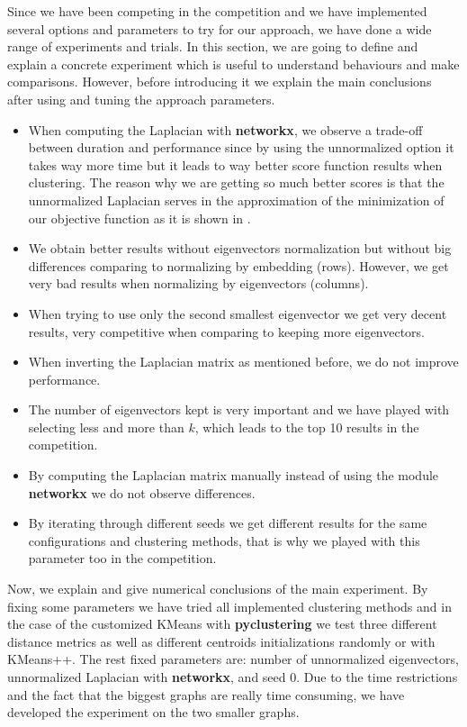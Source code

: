 \documentclass[11pt]{extarticle}
\begin{document}
\label{results}

Since we have been competing in the competition and we have implemented several options and parameters to try for our approach, we have done a wide range of experiments and trials. In this section, we are going to define and explain a concrete experiment which is useful to understand behaviours and make comparisons. However, before introducing it we explain the main conclusions after using and tuning the approach parameters.
\begin{itemize}
    \item When computing the Laplacian with \textbf{networkx}, we observe a trade-off between duration and performance since by using the unnormalized option it takes way more time but it leads to way better score function results when clustering. The reason why we are getting so much better scores is that the unnormalized Laplacian serves in the approximation of the minimization of our objective function as it is shown in \cite{buger_2015}. 
    \item We obtain better results without eigenvectors normalization but without big differences comparing to normalizing by embedding (rows). However, we get very bad results when normalizing by eigenvectors (columns).
    \item When trying to use only the second smallest eigenvector we get very decent results, very competitive when comparing to keeping more eigenvectors.
    \item When inverting the Laplacian matrix as mentioned before, we do not improve performance.
    \item The number of eigenvectors kept is very important and we have played with selecting less and more than $k$, which leads to the top 10 results in the competition.
    \item By computing the Laplacian matrix manually instead of using the module \textbf{networkx} we do not observe differences.
    \item By iterating through different seeds we get different results for the same configurations and clustering methods, that is why we played with this parameter too in the competition.
\end{itemize}

Now, we explain and give numerical conclusions of the main experiment. By fixing some parameters we have tried all implemented clustering methods and in the case of the customized KMeans with \textbf{pyclustering} we test three different distance metrics as well as different centroids initializations randomly or with KMeans++. The rest fixed parameters are: number of unnormalized eigenvectors, unnormalized Laplacian with \textbf{networkx}, and seed 0. Due to the time restrictions and the fact that the biggest graphs are really time consuming, we have developed the experiment on the two smaller graphs.\\
\end{document}
